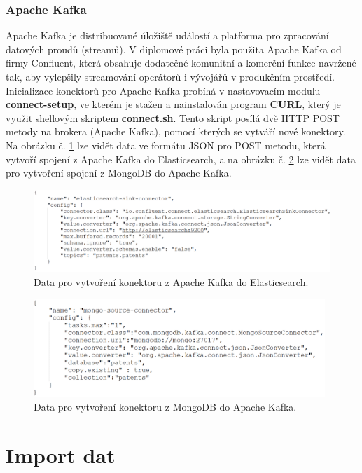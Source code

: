 \subsubsection{Apache Kafka}
Apache Kafka je distribuované úložiště událostí a platforma pro zpracování datových proudů (streamů). V diplomové práci byla použita Apache Kafka od firmy Confluent, která obsahuje dodatečné komunitní a komerční funkce navržené tak, aby vylepšily streamování operátorů i vývojářů v produkčním prostředí.
\newline
\indent Inicializace konektorů pro Apache Kafka probíhá v nastavovacím modulu \textbf{connect-setup}, ve kterém je stažen a nainstalován program \textbf{CURL}, který je využit shellovým skriptem \textbf{connect.sh}. Tento skript posílá dvě \gls{HTTP} POST metody na brokera (Apache Kafka), pomocí kterých se vytváří nové konektory. Na obrázku č. \ref{fig:sink} lze vidět data ve formátu JSON pro POST metodu, která vytvoří spojení z Apache Kafka do Elasticsearch, a na obrázku č. \ref{fig:source} lze vidět data pro vytvoření spojení z MongoDB do Apache Kafka.
\begin{figure}[H]
\centering
\includegraphics[width=12cm]{img/sink}
\caption{Data pro vytvoření konektoru z Apache Kafka do Elasticsearch.}
\label{fig:sink}
\end{figure}
\begin{figure}[H]
\centering
\includegraphics[width=11cm]{img/source}
\caption{Data pro vytvoření konektoru z MongoDB do Apache Kafka.}
\label{fig:source}
\end{figure}


\section{Import dat}
